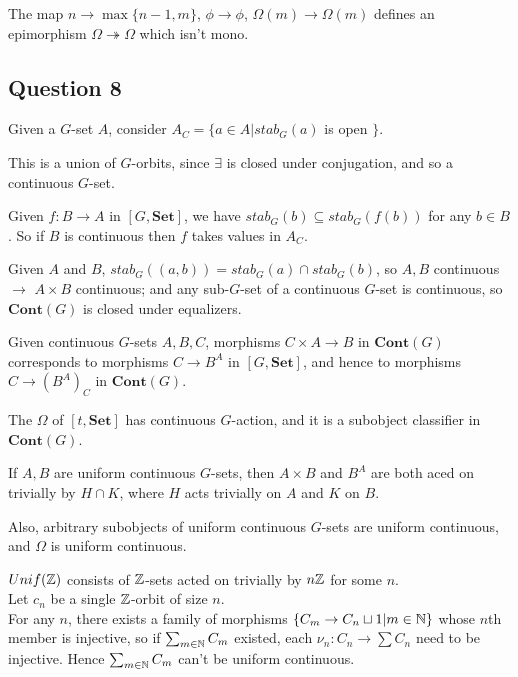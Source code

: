 \documentclass[a4paper]{article}
\begin{document}

The map $n \to \max\{n-1,m\}$, $\phi \to \phi$, $\Omega(m) \to \Omega(m)$ defines an epimorphism $\Omega \twoheadrightarrow \Omega$ which isn't mono.

\subsection{Question 8}

Given a $G$-set $A$, consider $A_C = \{a \in A | stab_G (a)$ is open $\}$.

This is a union of $G$-orbits, since $\exists$ is closed under conjugation, and so a continuous $G$-set.

Given $f:B \to A$ in $[G,\mathbf{Set}]$, we have $stab_G(b) \subseteq stab_G(f(b))$ for any $b \in B$. So if $B$ is continuous then $f$ takes values in $A_C$.

Given $A$ and $B$, $stab_G((a,b)) = stab_G(a) \cap stab_G(b)$, so $A,B$ continuous $\to$ $A \times B$ continuous; and any sub-$G$-set of a continuous $G$-set is continuous, so $\mathbf{Cont}(G)$ is closed under equalizers.

Given continuous $G$-sets $A,B,C$, morphisms $C \times A \to B$ in $\mathbf{Cont}(G)$ corresponds to morphisms $C \to B^A$ in $[G,\mathbf{Set}]$, and hence to morphisms $C \to (B^A)_C$ in $\mathbf{Cont}(G)$.

The $\Omega$ of $[t,\mathbf{Set}]$ has continuous $G$-action, and it is a subobject classifier in $\mathbf{Cont}(G)$.

If $A,B$ are uniform continuous $G$-sets, then $A \times B$ and $B^A$ are both aced on trivially by $H \cap K$, where $H$ acts trivially on $A$ and $K$ on $B$.

Also, arbitrary subobjects of uniform continuous $G$-sets are uniform continuous, and $\Omega$ is uniform continuous.

$Unif(\mathbb{Z})$ consists of $\mathbb{Z}$-sets acted on trivially by $n\mathbb{Z}$ for some $n$.\\
Let $c_n$ be a single $\mathbb{Z}$-orbit of size $n$.\\
For any $n$, there exists a family of morphisms $\{C_m \to C_n \sqcup 1 | m \in \mathbb{N}\}$ whose $n$th member is injective, so if $\sum_{m \in \mathbb{N}} C_m$ existed, each $\nu_n:C_n \to \sum C_n$ need to be injective. Hence $\sum_{m \in \mathbb{N}} C_m$ can't be uniform continuous.
\end{document}
